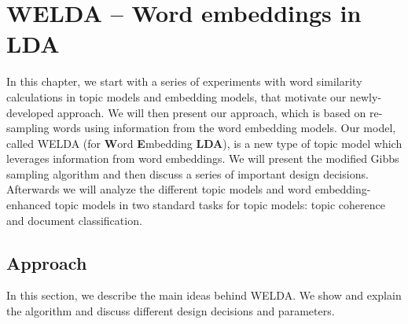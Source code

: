\documentclass[
        a4paper,
        titlepage,
        twoside,
        parskip
        ]{scrbook}
\theoremstyle{break}
\begin{document}


\chapter{WELDA -- Word embeddings in LDA}
\label{sec:welda}

In this chapter, we start with a series of experiments with word similarity calculations in topic models and embedding models, that motivate our newly-developed approach.
We will then present our approach, which is based on re-sampling words using information from the word embedding models.
Our model, called WELDA (for \textbf{W}ord \textbf{E}mbedding \textbf{LDA}), is a new type of topic model which leverages information from word embeddings.
We will present the modified Gibbs sampling algorithm and then discuss a series of important design decisions.
Afterwards we will analyze the different topic models and word embedding-enhanced topic models in two standard tasks for topic models: topic coherence and document classification.

\section{Approach}
In this section, we describe the main ideas behind WELDA.
We show and explain the algorithm and discuss different design decisions and parameters.
\end{document}
